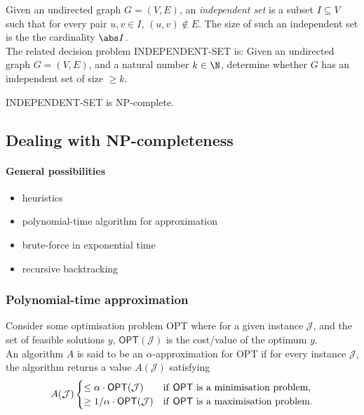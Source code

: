 \documentclass{article}
\begin{document}
\begin{definition}
	Given an undirected graph $G=(V,E)$, an \emph{independent set} is
	a subset $I\subseteq V$ such that for every pair $u,v\in I$,
	$(u,v)\not\in E$. The size of such an independent set is the
	the cardinality $\abs I$.\\
	The related decision problem INDEPENDENT-SET is: Given an undirected graph $G=(V,E)$,
	and a natural number $k\in\N$, determine whether $G$ has an independent
	set of size $\geq k$.
\end{definition}

\begin{proposition}
	INDEPENDENT-SET is NP-complete.
\end{proposition}


\subsection{Dealing with NP-completeness}


\paragraph{General possibilities}
\begin{itemize}
	\item heuristics
	\item polynomial-time algorithm for approximation
	\item brute-force in exponential time
	\item recursive backtracking
\end{itemize}

\subsubsection{Polynomial-time approximation}

\begin{definition}
	Consider some optimisation problem \textsf{OPT} where for a given
	instance $\mathcal{J}$, and the set of feasible solutions $y$,
	$\textsf{OPT}(\mathcal{J})$ is the cost/value of the optimum $y$.\\
	An algorithm $A$ is said to be an $\alpha$-approximation for \textsf{OPT}
	if for every instance $\mathcal{J}$, the algorithm returns a value
	$A(\mathcal{J})$ satisfying
	\begin{align*}
		A(\mathcal{J}) \begin{cases}
			               \leq \alpha \cdot \textsf{OPT}(\mathcal{J})   & \text{if \textsf{OPT} is a minimisation problem}, \\
			               \geq 1/\alpha \cdot \textsf{OPT}(\mathcal{J}) & \text{if \textsf{OPT} is a maximisation problem}.
		               \end{cases}
	\end{align*}
\end{definition}
\end{document}
